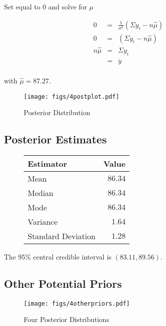\documentclass[12pt]{article}
\newcommand{\ybar}{\overline{y}}
\begin{document}
Set equal to 0 and solve for $\hat{\mu}$

\begin{eqnarray*}
0 &=& \frac{1}{\sigma^2}(\Sigma y_i-n\hat{\mu}) \\
0 &=& (\Sigma y_i-n\hat{\mu}) \\
n\hat{\mu} &=& \Sigma y_i \\
&=& \ybar \\
\end{eqnarray*}

with $\hat{\mu}=87.27$.

\begin{figure}[H]
\begin{center}
\texttt{[image: figs/4postplot.pdf]}
\caption{Posterior Distribution}
\end{center}
\end{figure}

\subsection{Posterior Estimates}

\begin{figure}[H]
\begin{center}
\begin{tabular}{l|r}
Estimator & \multicolumn{1}{l}{Value} \\ \hline \hline
Mean               & $86.34$ \\
Median             & $86.34$ \\
Mode               & $86.34$ \\
Variance           & $1.64$ \\
Standard Deviation & $1.28$ \\
\end{tabular}
\end{center}
\end{figure}

\noindent The 95\% central credible interval is $(83.11, 89.56)$.


\subsection{Other Potential Priors}

\begin{figure}[H]
\begin{center}
\texttt{[image: figs/4otherpriors.pdf]}
\caption{Four Posterior Distributions}
\end{center}
\end{figure}
\end{document}
